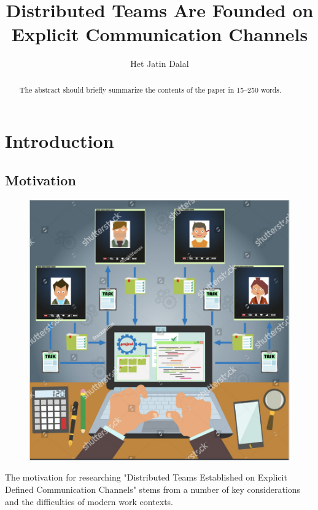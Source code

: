 \documentclass[runningheads]{llncs}
\begin{document}
%
\title{Distributed Teams Are Founded on Explicit
Communication Channels}
%
%
\author{Het Jatin Dalal}
%

%

%
%
\maketitle              %
%

\begin{abstract}
    The abstract should briefly summarize the contents of the paper in
    15--250 words.
    
    \end{abstract}
    \tableofcontents
    \newpage

    \section{Introduction}
    \subsection{Motivation}

    \begin{figure}   
        \includegraphics[width=0.2\linewidth]{DTlogo.png}
    \end{figure}

    The motivation for researching "Distributed Teams Established on Explicit Defined Communication Channels" stems from a number of key considerations and the difficulties of modern work contexts.
    
\end{document}
